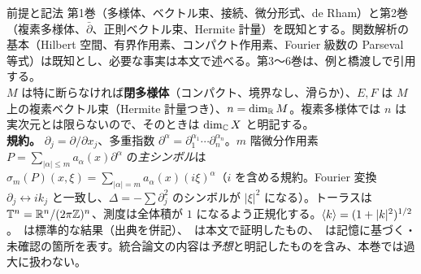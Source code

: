 \begin{goalbox}{前提と記法}
第1巻（多様体、ベクトル束、接続、微分形式、de Rham）と第2巻（複素多様体、$\bar\partial$、正則ベクトル束、Hermite 計量）を既知とする。関数解析の基本（Hilbert 空間、有界作用素、コンパクト作用素、Fourier 級数の Parseval 等式）は既知とし、必要な事実は本文で述べる。第3〜6巻は、例と橋渡しで引用する。\\
$M$ は特に断らなければ\textbf{閉多様体}（コンパクト、境界なし、滑らか）、$E,F$ は $M$ 上の複素ベクトル束（Hermite 計量つき）、$n=\dim_{\mathbb R}M$。複素多様体では $n$ は実次元とは限らないので、そのときは $\dim_{\mathbb C}X$ と明記する。\\
\textbf{規約。} $\partial_j=\partial/\partial x_j$、多重指数 $\partial^\alpha=\partial_1^{\alpha_1}\cdots\partial_n^{\alpha_n}$。$m$ 階微分作用素 $P=\sum_{|\alpha|\le m}a_\alpha(x)\partial^\alpha$ の\emph{主シンボル}は $\sigma_m(P)(x,\xi)=\sum_{|\alpha|=m}a_\alpha(x)(i\xi)^\alpha$（$i$ を含める規約。Fourier 変換 $\partial_j\leftrightarrow ik_j$ と一致し、$\Delta=-\sum\partial_j^2$ のシンボルが $|\xi|^2$ になる）。トーラスは $\mathbb T^n=\mathbb R^n/(2\pi\mathbb Z)^n$、測度は全体積が $1$ になるよう正規化する。$\langle k\rangle=(1+|k|^2)^{1/2}$。\tC\ は標準的な結果（出典を併記）、\tP\ は本文で証明したもの、\tQ\ は記憶に基づく・未確認の箇所を表す。統合論文の内容は\emph{予想}と明記したものを含み、本巻では過大に扱わない。
\end{goalbox}
\tableofcontents
\newpage
